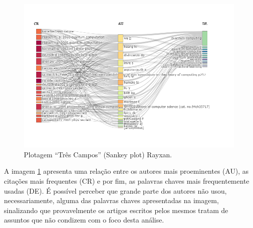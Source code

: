 \begin{figure}
    \centering
    \includegraphics[width=1\textwidth]{experiments/Rayxan/PesqBibliogr/ComputacaoQuantica/WoS-20220206/ThreeFieldsPlot.png}
    \caption{Plotagem ``Três Campos'' (Sankey plot) Rayxan.}
    \label{fig:three:fields:Rayxan}
\end{figure}

A imagem \ref{fig:three:fields:Rayxan} apresenta uma relação entre os autores mais proeminentes (AU), as citações mais frequentes (CR) e por fim, as palavras chaves mais frequentemente usadas (DE). É possível perceber que grande parte dos autores não usou, necessariamente, alguma das palavras chaves apresentadas na imagem, sinalizando que provavelmente os artigos escritos pelos mesmos tratam de assuntos que não condizem com o foco desta análise.

